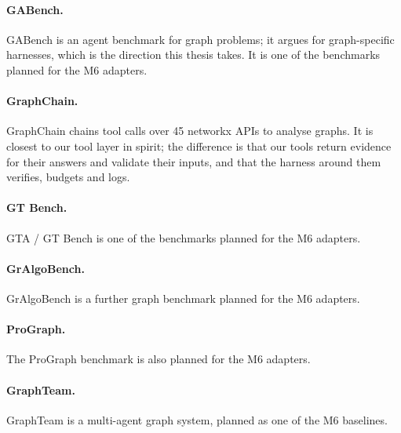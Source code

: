 \paragraph{GABench.} GABench \cite{gabench} is an agent benchmark for graph problems; it argues for graph-specific
harnesses, which is the direction this thesis takes. It is one of the benchmarks planned for the M6 adapters.

\paragraph{GraphChain.} GraphChain \cite{graphchain} chains tool calls over 45 networkx APIs to analyse graphs. It is
closest to our tool layer in spirit; the difference is that our tools return evidence for their answers and validate
their inputs, and that the harness around them verifies, budgets and logs.

\paragraph{GT Bench.} GTA / GT Bench \cite{gtbench} is one of the benchmarks planned for the M6 adapters.

\paragraph{GrAlgoBench.} GrAlgoBench \cite{gralgobench} is a further graph benchmark planned for the M6 adapters.

\paragraph{ProGraph.} The ProGraph benchmark \cite{prograph} is also planned for the M6 adapters.

\paragraph{GraphTeam.} GraphTeam \cite{graphteam} is a multi-agent graph system, planned as one of the M6 baselines.

